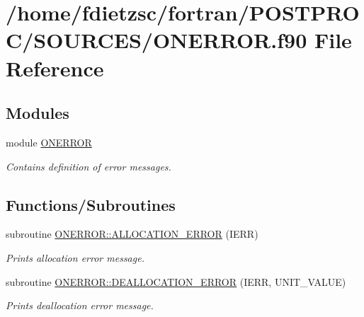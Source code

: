 \hypertarget{ONERROR_8f90}{
\section{/home/fdietzsc/fortran/POSTPROC/SOURCES/ONERROR.f90 File Reference}
\label{ONERROR_8f90}
}
\subsection*{Modules}
\begin{DoxyCompactItemize}
\item 
module \hyperlink{namespaceONERROR}{ONERROR}


\begin{DoxyCompactList}\small\item\em Contains definition of error messages. \end{DoxyCompactList}

\end{DoxyCompactItemize}
\subsection*{Functions/Subroutines}
\begin{DoxyCompactItemize}
\item 
subroutine \hyperlink{namespaceONERROR_a886bc1a5bcf6a0b449daef743c63ca96}{ONERROR::ALLOCATION\_\-ERROR} (IERR)
\begin{DoxyCompactList}\small\item\em Prints allocation error message. \end{DoxyCompactList}\item 
subroutine \hyperlink{namespaceONERROR_a65114034ce76f426e610df6aa8c4e69b}{ONERROR::DEALLOCATION\_\-ERROR} (IERR, UNIT\_\-VALUE)
\begin{DoxyCompactList}\small\item\em Prints deallocation error message. \end{DoxyCompactList}\end{DoxyCompactItemize}
